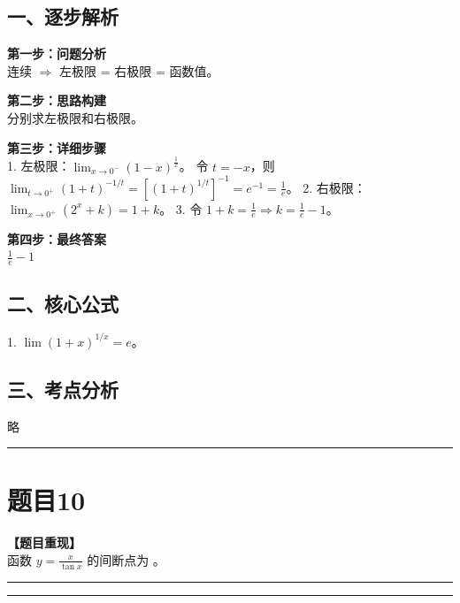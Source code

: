 \documentclass[12pt, a4paper]{ctexart}
\newcommand{\TopSeparator}{
    \par\noindent\rule{\textwidth}{1.5pt}\vspace{0.5em} %
}
\newcommand{\AnalysisSeparator}{
    \par\noindent\rule{\textwidth}{0.5pt}\vspace{0.2em}\hrule\vspace{0.5em} %
}
\newenvironment{RedAnalysis}{
    \par
    \color{red} %
}{
    \par
    \color{black} %
}
\begin{document}
\begin{RedAnalysis}

\subsection*{一、逐步解析}

\textbf{第一步：问题分析} \\
连续 $\Rightarrow$ 左极限 = 右极限 = 函数值。

\textbf{第二步：思路构建} \\
分别求左极限和右极限。

\textbf{第三步：详细步骤} \\
1. 左极限：$\lim_{x\to 0^-} (1-x)^{\frac{1}{x}}$。
   令 $t = -x$，则 $\lim_{t\to 0^+} (1+t)^{-1/t} = [(1+t)^{1/t}]^{-1} = e^{-1} = \frac{1}{e}$。
2. 右极限：$\lim_{x\to 0^+} (2^x + k) = 1 + k$。
3. 令 $1+k = \frac{1}{e} \Rightarrow k = \frac{1}{e} - 1$。

\textbf{第四步：最终答案} \\
$\frac{1}{e}-1$

\subsection*{二、核心公式}
1. $\lim (1+x)^{1/x} = e$。

\subsection*{三、考点分析}
略

\end{RedAnalysis}

\vspace{2em}

\TopSeparator
\section*{题目10}

\textbf{【题目重现】} \\
函数 $ y=\frac{x}{\tan x} $ 的间断点为 \underline{\hspace{2cm}}。

\AnalysisSeparator
\end{document}
